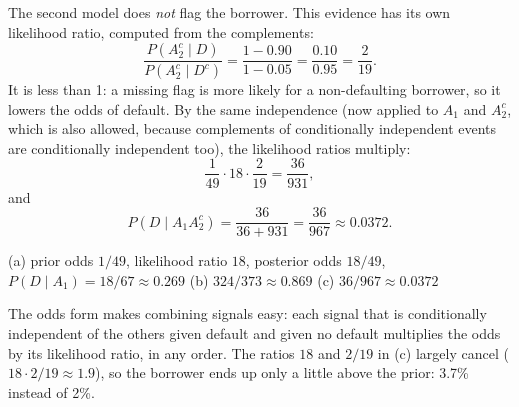 \begin{solution}
	 The second model does \emph{not} flag the
	borrower. This evidence has its own likelihood ratio, computed from the
	complements:
	\[ \frac{P(A_2^c\mid D)}{P(A_2^c\mid D^c)}=\frac{1-0.90}{1-0.05}
		=\frac{0.10}{0.95}=\frac{2}{19}. \]
	It is less than 1: a missing flag is more likely for a non-defaulting borrower, so it
	lowers the odds of default. By the same independence (now applied to $A_1$
	and $A_2^c$, which is also allowed, because complements of conditionally
	independent events are conditionally independent too), the likelihood
	ratios multiply:
	\[ \frac{1}{49}\cdot18\cdot\frac{2}{19}=\frac{36}{931}, \]
	and
	\[ P(D\mid A_1A_2^c)=\frac{36}{36+931}=\frac{36}{967}\approx0.0372. \]
	\begin{answer}
		(a) prior odds $1/49$, likelihood ratio $18$, posterior odds $18/49$,
		$P(D\mid A_1)=18/67\approx0.269$ \quad (b) $324/373\approx0.869$ \quad
		(c) $36/967\approx0.0372$
	\end{answer}
	\begin{remark}
		The odds form makes combining signals easy: each signal that is
		conditionally independent of the others given default and given no
		default multiplies the odds by its likelihood ratio, in any order. The ratios
		$18$ and $2/19$ in (c) largely cancel ($18\cdot2/19\approx1.9$), so the
		borrower ends up only a little above the prior: 3.7\% instead of 2\%.
	\end{remark}
\end{solution}
